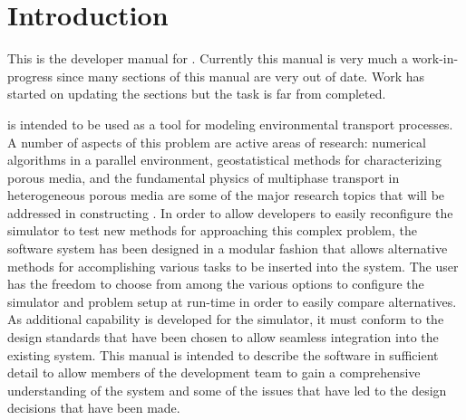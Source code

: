 
\chapter{Introduction}
\label{Introduction}

This is the developer manual for \parflow{}.  Currently this manual is
very much a work-in-progress since many sections of this manual are
very out of date.  Work has started on updating the sections but the task is far from
completed.

\parflow{} is intended to be used as a tool for modeling environmental
transport processes.  A number of aspects of this problem are active
areas of research: numerical algorithms in a parallel environment,
geostatistical methods for characterizing porous media, and the
fundamental physics of multiphase transport in heterogeneous porous
media are some of the major research topics that will be addressed in
constructing \parflow{}.  In order to allow developers to easily
reconfigure the \parflow{} simulator to test new methods for
approaching this complex problem, the software system has been
designed in a modular fashion that allows alternative methods for
accomplishing various tasks to be inserted into the system.  The user
has the freedom to choose from among the various options to configure
the simulator and problem setup at run-time in order to easily compare
alternatives.  As additional capability is developed for the
\parflow{} simulator, it must conform to the design standards that
have been chosen to allow seamless integration into the existing
system.  This manual is intended to describe the \parflow{} software
in sufficient detail to allow members of the \parflow{} development
team to gain a comprehensive understanding of the \parflow{} system
and some of the issues that have led to the design decisions that have
been made.


